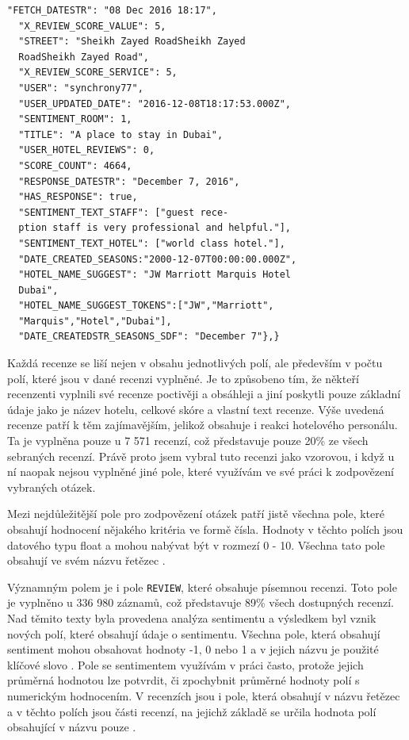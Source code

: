 \documentclass[czech,BP]{thesiskiv}
\begin{document}
\begin{lstlisting}[caption=Příkald recenze]
  "FETCH_DATESTR": "08 Dec 2016 18:17",
  "X_REVIEW_SCORE_VALUE": 5,
  "STREET": "Sheikh Zayed RoadSheikh Zayed 
  RoadSheikh Zayed Road",
  "X_REVIEW_SCORE_SERVICE": 5,
  "USER": "synchrony77",
  "USER_UPDATED_DATE": "2016-12-08T18:17:53.000Z",
  "SENTIMENT_ROOM": 1,
  "TITLE": "A place to stay in Dubai",
  "USER_HOTEL_REVIEWS": 0,
  "SCORE_COUNT": 4664,
  "RESPONSE_DATESTR": "December 7, 2016",
  "HAS_RESPONSE": true,
  "SENTIMENT_TEXT_STAFF": ["guest rece-
  ption staff is very professional and helpful."],
  "SENTIMENT_TEXT_HOTEL": ["world class hotel."],
  "DATE_CREATED_SEASONS:"2000-12-07T00:00:00.000Z",
  "HOTEL_NAME_SUGGEST": "JW Marriott Marquis Hotel
  Dubai",
  "HOTEL_NAME_SUGGEST_TOKENS":["JW","Marriott",
  "Marquis","Hotel","Dubai"],
  "DATE_CREATEDSTR_SEASONS_SDF": "December 7"},}
	\end{lstlisting}
	

Každá recenze se liší nejen v obsahu jednotlivých polí, ale především v počtu polí, které jsou v dané recenzi vyplněné. Je to způsobeno tím, že někteří recenzenti vyplnili své recenze poctivěji a obsáhleji a jiní poskytli pouze základní údaje jako je název hotelu, celkové skóre a vlastní text recenze. Výše uvedená recenze patří k těm zajímavějším, jelikož obsahuje i reakci hotelového personálu. Ta je vyplněna pouze u 7 571 recenzí, což představuje pouze 20\% ze všech sebraných recenzí. Právě proto jsem vybral tuto recenzi jako vzorovou, i když u ní naopak nejsou vyplněné jiné pole, které využívám ve své práci k zodpovězení vybraných otázek.


Mezi nejdůležitější pole pro zodpovězení otázek patří jistě všechna pole, které obsahují hodnocení nějakého kritéria ve formě čísla. Hodnoty v těchto polích jsou datového typu float a mohou nabývat být v rozmezí 0 - 10. Všechna tato pole obsahují ve svém názvu řetězec .


Významným polem je i pole \texttt{REVIEW}, které obsahuje písemnou recenzi. Toto pole je vyplněno u 336 980 záznamů, což představuje 89\% všech dostupných recenzí. Nad těmito texty byla provedena analýza sentimentu a výsledkem byl vznik nových polí, které obsahují údaje o sentimentu. Všechna pole, která obsahují sentiment mohou obsahovat hodnoty -1, 0 nebo 1 a v jejich názvu je použité klíčové slovo . Pole se sentimentem využívám v práci často, protože jejich průměrná hodnotou lze potvrdit, či zpochybnit průměrné hodnoty polí s numerickým hodnocením. V recenzích jsou i pole, která obsahují v názvu řetězec  a v těchto polích jsou části recenzí, na  jejichž základě se určila hodnota polí obsahující v názvu pouze .
\end{document}
